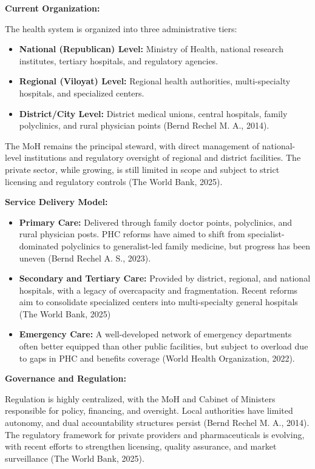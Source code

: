 \textbf{Current Organization:}

The health system is organized into three administrative tiers:

\begin{itemize}
\item
  \textbf{National (Republican) Level:} Ministry of Health, national
  research institutes, tertiary hospitals, and regulatory agencies.
\item
  \textbf{Regional (Viloyat) Level:} Regional health authorities,
  multi-specialty hospitals, and specialized centers.
\item
  \textbf{District/City Level:} District medical unions, central
  hospitals, family polyclinics, and rural physician points (Bernd
  Rechel M. A., 2014).
\end{itemize}

The MoH remains the principal steward, with direct management of
national-level institutions and regulatory oversight of regional and
district facilities. The private sector, while growing, is still limited
in scope and subject to strict licensing and regulatory controls (The
World Bank, 2025).

\textbf{Service Delivery Model:}

\begin{itemize}
\item
  \textbf{Primary Care:} Delivered through family doctor points,
  polyclinics, and rural physician posts. PHC reforms have aimed to
  shift from specialist-dominated polyclinics to generalist-led family
  medicine, but progress has been uneven (Bernd Rechel A. S., 2023).
\item
  \textbf{Secondary and Tertiary Care:} Provided by district, regional,
  and national hospitals, with a legacy of overcapacity and
  fragmentation. Recent reforms aim to consolidate specialized centers
  into multi-specialty general hospitals (The World Bank, 2025)
\item
  \textbf{Emergency Care:} A well-developed network of emergency
  departments often better equipped than other public facilities, but
  subject to overload due to gaps in PHC and benefits coverage (World
  Health Organization, 2022).
\end{itemize}

\textbf{Governance and Regulation:}

Regulation is highly centralized, with the MoH and Cabinet of Ministers
responsible for policy, financing, and oversight. Local authorities have
limited autonomy, and dual accountability structures persist (Bernd
Rechel M. A., 2014). The regulatory framework for private providers and
pharmaceuticals is evolving, with recent efforts to strengthen
licensing, quality assurance, and market surveillance (The World Bank,
2025).

